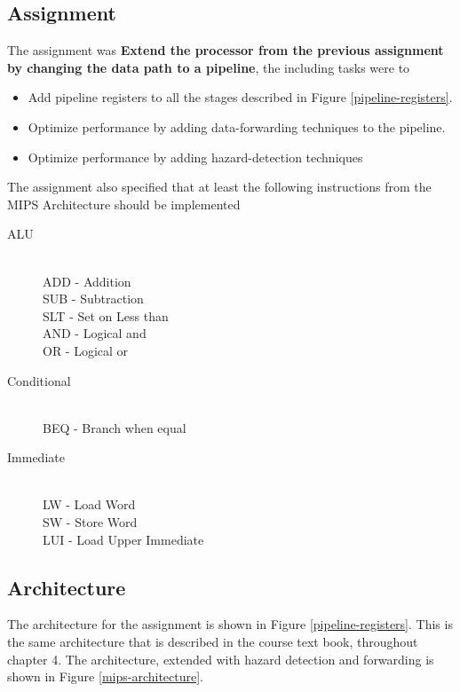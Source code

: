 \subsection{Assignment}
The assignment was \textbf{Extend the processor from the previous assignment by changing the 
data path to a pipeline}, the including tasks were to

\begin{itemize}
  \item Add pipeline registers to all the stages described in Figure \ref{pipeline-registers}.
  \item Optimize performance by adding data-forwarding techniques to the pipeline.
  \item Optimize performance by adding hazard-detection techniques
\end{itemize}
The assignment also specified that at least the following instructions from 
the MIPS Architecture should be implemented

\begin{description}
  \item[ALU] \hfill \\
    ADD - Addition \\
    SUB - Subtraction \\
    SLT - Set on Less than \\
    AND - Logical and \\
    OR - Logical or
  \item[Conditional] \hfill \\
    BEQ - Branch when equal
  \item[Immediate] \hfill \\
    LW - Load Word \\
    SW - Store Word \\
    LUI - Load Upper Immediate
\end{description}

\subsection{Architecture}
The architecture for the assignment is shown in Figure \ref{pipeline-registers}.
This is the same architecture that is described in the course 
text book\cite{patterson-hennesay}, throughout chapter 4.
The architecture, extended with hazard detection and forwarding is shown in
Figure \ref{mips-architecture}.

